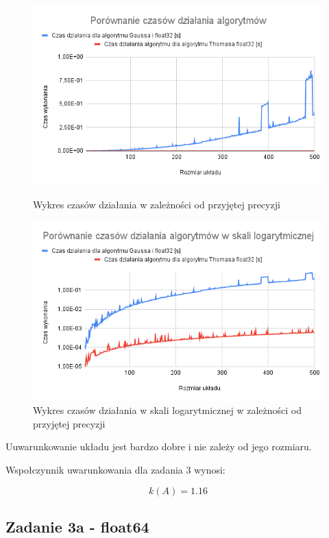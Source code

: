 \documentclass{article}
\begin{document}
\begin{figure}[H]
  \begin{minipage}[b]{0.49\textwidth}
    \includegraphics[width=\textwidth]{img11.png}
    \caption{Wykres czasów działania w zależności od przyjętej precyzji}
  \end{minipage}
  \hfill
  \begin{minipage}[b]{0.49\textwidth}
    \includegraphics[width=\textwidth]{img12.png}
    \caption{Wykres czasów działania w skali logarytmicznej w zależności od przyjętej precyzji}
  \end{minipage}
\end{figure}

\noindent
Uuwarunkowanie układu jest bardzo dobre i nie zależy od jego rozmiaru.

\noindent
Wspołczynnik uwarunkowania dla zadania 3 wynosi:

\[k(A) = 1.16\]

\newpage

\subsection{Zadanie 3a - float64}
\end{document}
